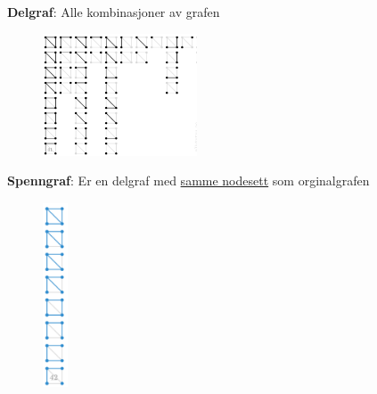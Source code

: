 \documentclass[12pt]{report}
\begin{document}

\par

\textbf{Delgraf}: Alle kombinasjoner av grafen\par




\begin{figure}[H]
	\begin{Center}
		\includegraphics[width=1.81in,height=1.43in]{./media/image109.png}
	\end{Center}
\end{figure}



\par

\textbf{Spenngraf}: Er en delgraf med \uline{samme nodesett} som orginalgrafen\par




\begin{figure}[H]
	\begin{Center}
		\includegraphics[width=0.29in,height=2.17in]{./media/image110.png}
	\end{Center}
\end{figure}
\end{document}
